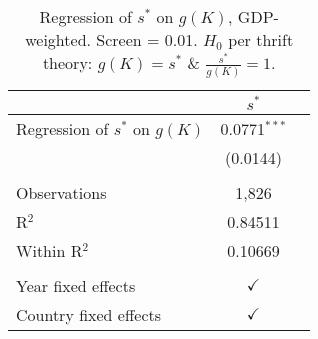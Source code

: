\begin{table}[pos=h]
\caption{Regression of \(s^*\) on \(g(K)\), GDP-weighted. Screen = 0.01. \(H_0\) per thrift theory: \(g(K) = s^*\) \& \(\frac{s^*}{g(K)} = 1\).}
\centering
\begin{tabularx}{\columnwidth}{lcc}
   \toprule
                                     & $s^*$ \\   
   \midrule 
   Regression of $s^*$ on \(g(K)\)   & 0.0771$^{***}$\\   
                                     & (0.0144)\\   
    \\
   Observations                      & 1,826\\  
   R$^2$                             & 0.84511\\  
   Within R$^2$                      & 0.10669\\  
    \\
   Year fixed effects                & $\checkmark$\\   
   Country fixed effects             & $\checkmark$\\   
   \bottomrule
\end{tabularx}
   \label{tbl-4}
\end{table}